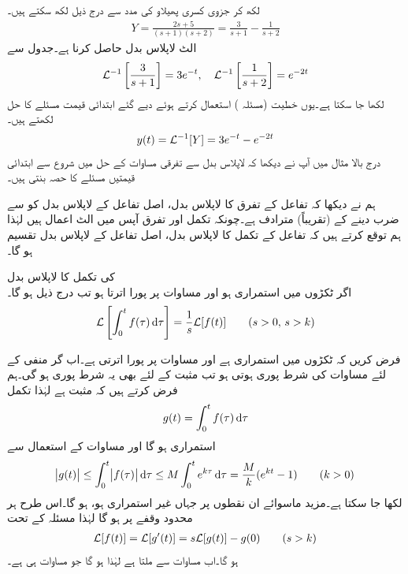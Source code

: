 لکھ کر جزوی کسری پھیلاو کی مدد سے  درج ذیل لکھ سکتے ہیں۔
\begin{align*}
Y=\frac{2s+5}{(s+1)(s+2)}=\frac{3}{s+1}-\frac{1}{s+2}
\end{align*}
 الٹ لاپلاس بدل حاصل کرنا ہے۔جدول  سے 
\begin{align*}
\mathcal{L}^{-1}\left[\frac{3}{s+1}\right]=3e^{-t}, \quad \mathcal{L}^{-1}\left[\frac{1}{s+2}\right]=e^{-2t}
\end{align*}
لکھا جا سکتا ہے۔یوں خطیت (مسئلہ ) استعمال کرتے ہوئے  دیے گئے ابتدائی قیمت مسئلے کا حل لکھتے ہیں۔
\begin{align*}
y(t)=\mathcal{L}^{-1}[Y]=3e^{-t}-e^{-2t}
\end{align*}
درج بالا مثال میں آپ نے دیکھا کہ لاپلاس بدل سے تفرقی مساوات کے حل میں شروع سے  ابتدائی قیمتیں مسئلے کا حصہ بنتی ہیں۔

ہم نے دیکھا کہ تفاعل کے تفرق کا لاپلاس بدل، اصل تفاعل کے لاپلاس بدل کو  سے ضرب دینے کے (تقریباً) مترادف ہے۔چونکہ تکمل اور تفرق آپس میں الٹ اعمال ہیں لہٰذا ہم توقع کرتے ہیں کہ تفاعل کے تکمل کا لاپلاس بدل، اصل تفاعل کے لاپلاس بدل تقسیم  ہو گا۔ 

\quad {} کی تکمل کا لاپلاس بدل\\
اگر  ٹکڑوں میں استمراری ہو اور مساوات  پر پورا اترتا ہو تب درج ذیل ہو گا۔
\begin{align}\label{مساوات_لاپلاس_تکمل_کا_بدل}
\Laplace\left[\int_{0}^{t} f(\tau) \dif \tau \right]=\frac{1}{s}\Laplace[f(t)]\quad \quad (s>0, \, s>k)
\end{align} 

فرض کریں کہ  ٹکڑوں میں استمراری ہے اور مساوات  پر پورا اترتی ہے۔اب گر منفی  کے لئے  مساوات  کی شرط پوری ہوتی ہو تب مثبت  کے لئے بھی یہ شرط پوری ہو گی۔ہم فرض کرتے ہیں کہ  مثبت ہے لہٰذا تکمل
\begin{align}\label{مساوات_لاپلاس_تفاعل_تکمل}
g(t)=\int_{0}^{t}f(\tau)\dif \tau
\end{align}
استمراری ہو گا اور مساوات  کے استعمال سے
\begin{align*}
\abs{g(t)}\le \int_{0}^{t} \abs{f(\tau)} \dif \tau \le M\int_{0}^{t} e^{k\tau} \dif \tau=\frac{M}{k}(e^{kt}-1)\quad \quad (k>0)
\end{align*}
لکھا جا سکتا ہے۔مزید ماسوائے ان نقطوں پر جہاں  غیر استمراری ہو،  ہو گا۔اس طرح  ہر محدود وقفے پر  ہو گا لہٰذا مسئلہ  کے تحت
\begin{align*}
\mathcal{L}[f(t)]=\mathcal{L}[g'(t)]=s\mathcal{L}[g(t)]-g(0) \quad \quad (s>k)
\end{align*}
ہو گا۔اب مساوات  سے  ملتا ہے لہٰذا  ہو گا جو مساوات  ہی ہے۔

